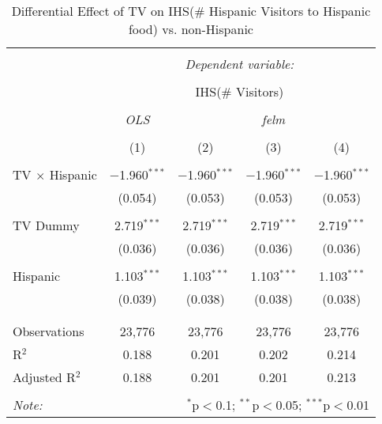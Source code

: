 
\begin{table}[!htbp] \centering 
  \caption{Differential Effect of TV on IHS(\# Hispanic Visitors to Hispanic food) vs. non-Hispanic} 
  \label{} 
\begin{tabular}{@{\extracolsep{-2pt}}lcccc} 
\\[-1.8ex]\hline 
\hline \\[-1.8ex] 
 & \multicolumn{4}{c}{\textit{Dependent variable:}} \\ 
\cline{2-5} 
\\[-1.8ex] & \multicolumn{4}{c}{IHS(\# Visitors)} \\ 
\\[-1.8ex] & \textit{OLS} & \multicolumn{3}{c}{\textit{felm}} \\ 
\\[-1.8ex] & (1) & (2) & (3) & (4)\\ 
\hline \\[-1.8ex] 
 TV $\times$ Hispanic & $-$1.960$^{***}$ & $-$1.960$^{***}$ & $-$1.960$^{***}$ & $-$1.960$^{***}$ \\ 
  & (0.054) & (0.053) & (0.053) & (0.053) \\ 
  & & & & \\ 
 TV Dummy & 2.719$^{***}$ & 2.719$^{***}$ & 2.719$^{***}$ & 2.719$^{***}$ \\ 
  & (0.036) & (0.036) & (0.036) & (0.036) \\ 
  & & & & \\ 
 Hispanic & 1.103$^{***}$ & 1.103$^{***}$ & 1.103$^{***}$ & 1.103$^{***}$ \\ 
  & (0.039) & (0.038) & (0.038) & (0.038) \\ 
  & & & & \\ 
\hline \\[-1.8ex] 
Observations & 23,776 & 23,776 & 23,776 & 23,776 \\ 
R$^{2}$ & 0.188 & 0.201 & 0.202 & 0.214 \\ 
Adjusted R$^{2}$ & 0.188 & 0.201 & 0.201 & 0.213 \\ 
\hline 
\hline \\[-1.8ex] 
\textit{Note:}  & \multicolumn{4}{r}{$^{*}$p$<$0.1; $^{**}$p$<$0.05; $^{***}$p$<$0.01} \\ 
\end{tabular} 
\end{table} 
